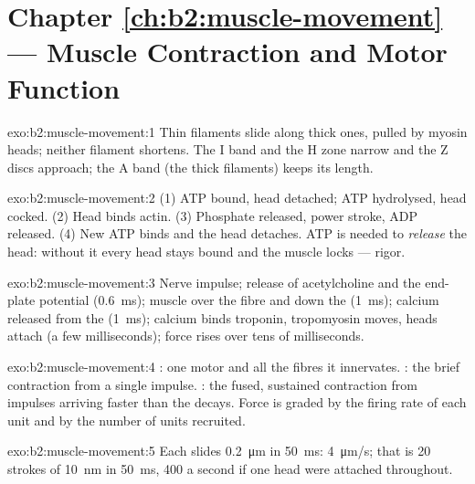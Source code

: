 \section*{Chapter \ref{ch:b2:muscle-movement} --- Muscle Contraction and Motor Function}

\begin{solution}{exo:b2:muscle-movement:1}
Thin filaments slide along thick ones, pulled by myosin heads;
neither filament shortens. The I band and the H zone narrow and the
Z discs approach; the A band (the thick filaments) keeps its length.
\end{solution}

\begin{solution}{exo:b2:muscle-movement:2}
(1) ATP bound, head detached; ATP hydrolysed, head cocked. (2) Head
binds actin. (3) Phosphate released, power stroke, ADP released.
(4) New ATP binds and the head detaches. ATP is needed to
\emph{release} the head: without it every head stays bound and the
muscle locks --- rigor.
\end{solution}

\begin{solution}{exo:b2:muscle-movement:3}
Nerve impulse; release of acetylcholine and the end-plate potential
(\qty{0.6}{ms}); muscle  over the fibre and down the
 (\qty{1}{ms}); calcium released from the  (\qty{1}{ms}); calcium binds troponin, tropomyosin moves,
heads attach (a few milliseconds); force rises over tens of
milliseconds.
\end{solution}

\begin{solution}{exo:b2:muscle-movement:4}
: one motor  and all the fibres it innervates.
: the brief contraction from a single impulse. : the
fused, sustained contraction from impulses arriving faster than the
 decays. Force is graded by the firing rate of each unit and
by the number of units recruited.
\end{solution}

\begin{solution}{exo:b2:muscle-movement:5}
Each  slides \qty{0.2}{\micro m} in \qty{50}{ms}:
\qty{4}{\micro m/s}; that is 20 strokes of \qty{10}{nm} in
\qty{50}{ms}, 400 a second if one head were attached throughout.
\end{solution}

